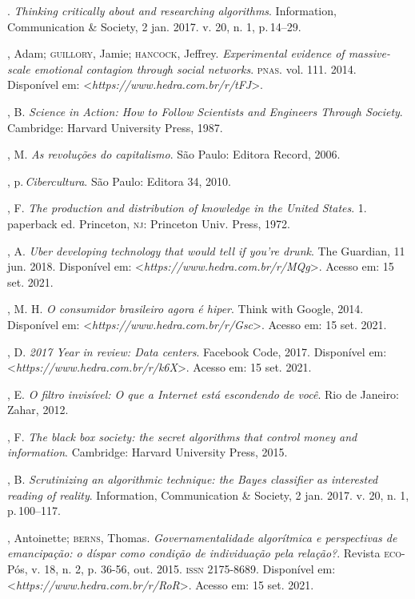 \begin{bibliohedra}
\titidem. \emph{Thinking critically about and researching
algorithms}. Information, Communication \& Society, 2 jan. 2017. v. 20,
n. 1, p.\,14--29.

, Adam; \textsc{guillory}, Jamie; \textsc{hancock}, Jeffrey. \emph{Experimental evidence of massive-scale emotional contagion through social networks}. \textsc{pnas}. vol.
111. 2014. Disponível em: \textless{}\emph{https://www.hedra.com.br/r/tFJ}\textgreater{}.

, B. \emph{Science in Action: How to Follow Scientists and
Engineers Through Society}. Cambridge: Harvard University Press, 1987.

, M. \emph{As revoluções do capitalismo}. São Paulo: Editora
Record, 2006.

, p.\,\emph{Cibercultura}. São Paulo: Editora 34, 2010.

, F. \emph{The production and distribution of knowledge in the
United States}. 1. paperback ed. Princeton, \textsc{nj}: Princeton Univ.
Press, 1972.

, A. \emph{Uber developing technology that would tell if you're
drunk}. The Guardian, 11 jun. 2018. Disponível em: \textless{}\emph{https://www.hedra.com.br/r/MQg}\textgreater{}.
Acesso em: 15 set. 2021.

, M. H. \emph{O consumidor brasileiro agora é hiper}. Think
with Google, 2014. Disponível em: \textless{}\emph{https://www.hedra.com.br/r/Gsc}\textgreater{}.
Acesso em: 15 set. 2021.

, D. \emph{2017 Year in review: Data centers}. Facebook Code,
2017. Disponível em: \textless{}\emph{https://www.hedra.com.br/r/k6X}\textgreater{}. Acesso em: 15 set. 2021.

, E. \emph{O filtro invisível: O que a Internet está escondendo
de você}. Rio de Janeiro: Zahar, 2012.

, F. \emph{The black box society: the secret algorithms that
control money and information}. Cambridge: Harvard University Press,
2015.

, B. \emph{Scrutinizing an algorithmic technique: the Bayes
classifier as interested reading of reality}. Information, Communication
\& Society, 2 jan. 2017. v. 20, n. 1, p.\,100--117.

, Antoinette; \textsc{berns}, Thomas. \emph{Governamentalidade
algorítmica e perspectivas de emancipação: o díspar como condição de
individuação pela relação?}. Revista \textsc{eco}-Pós, v. 18, n. 2, p.
36-56, out. 2015. \textsc{issn} 2175-8689. Disponível em:
\textless{}\emph{https://www.hedra.com.br/r/RoR}\textgreater{}. Acesso em: 15 set. 2021.


\end{bibliohedra}
